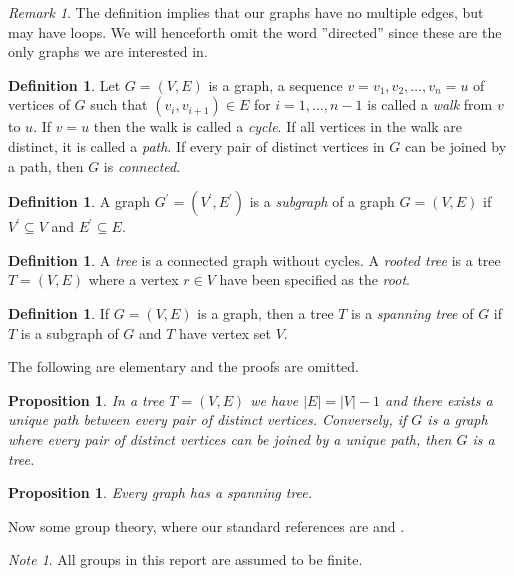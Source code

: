 \documentclass[draft]{amsart}
\theoremstyle{plain}
\newtheorem{pr}[theorem]{Proposition}
\theoremstyle{definition}
\newtheorem{deff}[theorem]{Definition}
\theoremstyle{remark}
\newtheorem{note}{Note}
\newtheorem{remark}{Remark}
\providecommand{\abs}[1]{\left\lvert #1 \right\rvert}
\begin{document}
\begin{remark}
The definition implies that our graphs have no multiple edges, but may have loops. We will henceforth omit the word ''directed'' since these are the only
graphs we are interested in.
\end{remark}

\begin{deff} \label{def_graph_misc}
Let $G = (V, E)$ is a graph, a sequence $v = v_1, v_2, \dotsc, v_n =
  u$ of vertices of $G$ such that $(v_i, v_{i + 1}) \in E$ for $i = 1,
  \dotsc, n - 1$ is called a \emph{walk} from $v$ to $u$. If $v = u$
  then the walk is called a \emph{cycle}. If all vertices in the walk are
  distinct, it is called a \emph{path}. If every pair of distinct vertices in $G$ can be joined by a path, then $G$ is \emph{connected}.
\end{deff}

\begin{deff}
A graph $G^{\prime} = (V^{\prime}, E^{\prime})$ is a \emph{subgraph} of a graph $G = (V, E)$ if $V^{\prime} \subseteq V$ and $E^{\prime} \subseteq E$.
\end{deff}

\begin{deff} \label{def_tree}
A \emph{tree} is a connected graph without cycles. A \emph{rooted tree} is a tree $T = (V, E)$ where a vertex $r \in V$ have been specified as the \emph{root}.
\end{deff}

\begin{deff}
If $G = (V, E)$ is a graph, then a tree $T$ is a \emph{spanning tree} of $G$ if $T$ is a subgraph of $G$ and $T$ have vertex set $V$.
\end{deff}

The following are elementary and the proofs are omitted.
\begin{pr}
In a tree $T = (V, E)$ we have $\abs{E} = \abs{V} - 1$ and there
exists a \emph{unique} path between every pair of distinct
vertices. Conversely, if $G$ is a graph where every pair of distinct
vertices can be joined by a unique path, then $G$ is a tree.
\end{pr}

\begin{pr}
Every graph has a spanning tree.
\end{pr}

Now some group theory, where our standard references are \cite{bb96} and \cite{rose78}.
\begin{note}
All groups in this report are assumed to be finite.
\end{note}
\end{document}
